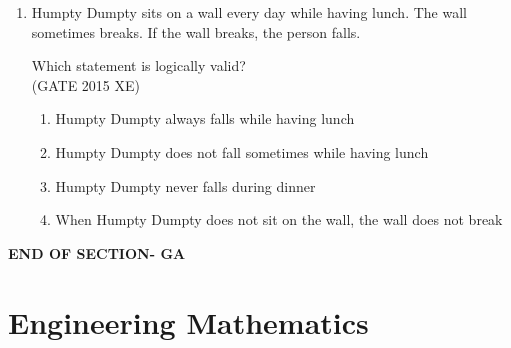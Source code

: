 \documentclass[journal,12pt,onecolumn]{IEEEtran}
\begin{document}
\begin{enumerate}
\item Humpty Dumpty sits on a wall every day while having lunch. The wall sometimes breaks. If the wall breaks, the person falls.

Which statement is logically valid?\\
\hfill{(GATE 2015 XE)}
\begin{multicols}{2}
\begin{enumerate}
\item Humpty Dumpty always falls while having lunch
\item Humpty Dumpty does not fall sometimes while having lunch
\item Humpty Dumpty never falls during dinner
\item When Humpty Dumpty does not sit on the wall, the wall does not break
\end{enumerate}
\end{multicols}

\end{enumerate}
\vspace{2\baselineskip}
\begin{center}
    \item[\textbf{END OF SECTION- GA}]
\end{center}


\newpage
\section*{Engineering Mathematics}
\bigskip
\end{document}
